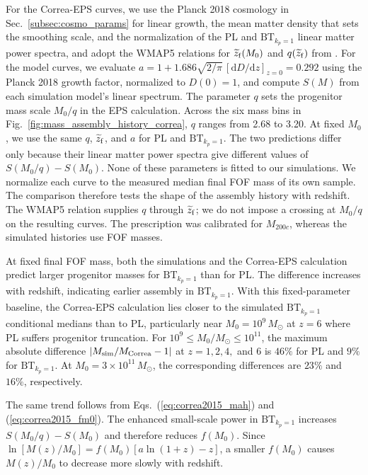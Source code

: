 \documentclass[
 reprint,
 superscriptaddress,
 nofootinbib,
 nobibnotes,
 amsmath,
 amssymb,
 aps,
 prd,
 floatfix,
 longbibliography
]{revtex4-2}
\DeclareRobustCommand{\BTKPone}{\ensuremath{\mathrm{BT}_{k_p=1}}}
\begin{document}
For the Correa-EPS curves, we use the Planck 2018 cosmology in Sec.~\ref{subsec:cosmo_params} for linear growth, the mean matter density that sets the smoothing scale, and the normalization of the PL and \BTKPone{} linear matter power spectra, and adopt the WMAP5 relations for \(\widetilde z_{\rm f}(M_0)\) and \(q(\widetilde z_{\rm f})\) from \citet{Correa2015MAHI}. For the model curves, we evaluate \(a=1+1.686\sqrt{2/\pi}\,[\mathrm{d}D/\mathrm{d}z]_{z=0}=0.292\) using the Planck 2018 growth factor, normalized to \(D(0)=1\), and compute \(S(M)\) from each simulation model's linear spectrum. The parameter \(q\) sets the progenitor mass scale \(M_0/q\) in the EPS calculation. Across the six mass bins in Fig.~\ref{fig:mass_assembly_history_correa}, \(q\) ranges from 2.68 to 3.20. At fixed \(M_0\), we use the same \(q\), \(\widetilde z_{\rm f}\), and \(a\) for PL and \BTKPone{}. The two predictions differ only because their linear matter power spectra give different values of \(S(M_0/q)-S(M_0)\). None of these parameters is fitted to our simulations. We normalize each curve to the measured median final FOF mass of its own sample. The comparison therefore tests the shape of the assembly history with redshift. The WMAP5 relation supplies \(q\) through \(\widetilde z_{\rm f}\); we do not impose a crossing at \(M_0/q\) on the resulting curves. The prescription was calibrated for \(M_{200c}\), whereas the simulated histories use FOF masses.


At fixed final FOF mass, both the simulations and the Correa-EPS calculation predict larger progenitor masses for \BTKPone{} than for PL. The difference increases with redshift, indicating earlier assembly in \BTKPone{}. With this fixed-parameter baseline, the Correa-EPS calculation lies closer to the simulated \BTKPone{} conditional medians than to PL, particularly near \(M_0=10^9\,M_\odot\) at \(z=6\) where PL suffers progenitor truncation. For \(10^9\le M_0/M_\odot\le10^{11}\), the maximum absolute difference \(\lvert M_{\rm sim}/M_{\rm Correa}-1\rvert\) at \(z=1,2,4,\) and \(6\) is \(46\%\) for PL and \(9\%\) for \BTKPone{}. At \(M_0=3\times10^{11}\,M_\odot\), the corresponding differences are \(23\%\) and \(16\%\), respectively.

The same trend follows from Eqs.~(\ref{eq:correa2015_mah}) and (\ref{eq:correa2015_fm0}). The enhanced small-scale power in \BTKPone{} increases \(S(M_0/q)-S(M_0)\) and therefore reduces \(f(M_0)\). Since \(\ln[M(z)/M_0]=f(M_0)[a\ln(1+z)-z]\), a smaller \(f(M_0)\) causes \(M(z)/M_0\) to decrease more slowly with redshift.
\end{document}
